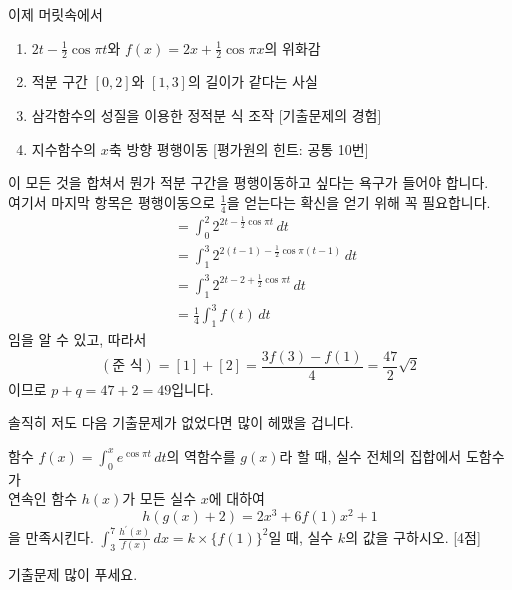 \documentclass[serif]{beamer}
\begin{document}
\begin{frame}
    이제 머릿속에서
    \begin{enumerate}[-]
        \item $2t-\frac{1}{2}\cos\pi t$와 $f(x)=2x+\frac{1}{2}\cos\pi x$의 위화감
        \item 적분 구간 $[0,2]$와 $[1,3]$의 길이가 같다는 사실
        \item 삼각함수의 성질을 이용한 정적분 식 조작 [기출문제의 경험]
        \item 지수함수의 $x$축 방향 평행이동 [평가원의 힌트: 공통 10번]
    \end{enumerate}
    이 모든 것을 합쳐서 뭔가 적분 구간을 평행이동하고 싶다는 욕구가 들어야 합니다. \\
    여기서 마지막 항목은 평행이동으로 $\frac{1}{4}$을 얻는다는 확신을 얻기 위해 꼭 필요합니다.
    \begin{align*}
        [\text{2}]&=\int_{0}^{2}2^{2t-\frac{1}{2}\cos\pi t}\,dt\\[3pt]
        &=\int_{1}^{3}2^{2(t-1)-\frac{1}{2}\cos\pi(t-1)}\,dt\\[3pt]
        &=\int_{1}^{3}2^{2t-2+\frac{1}{2}\cos\pi t}\,dt\\[3pt]
        &=\frac{1}{4}\int_{1}^{3}f(t)\,dt
    \end{align*}
    임을 알 수 있고, 따라서
    \[
        (\text{준 식})=[\text{1}]+[\text{2}]=\frac{3f(3)-f(1)}{4}=\frac{47}{2}\sqrt{2}
    \]
    이므로 $p+q=47+2=49$입니다.
\end{frame}

\begin{frame}
    솔직히 저도 다음 기출문제가 없었다면 많이 헤맸을 겁니다.
    \begin{hint}
        함수 $\displaystyle f(x)=\int_0^xe^{\cos\pi t}\,dt$의 역함수를 $g(x)$라 할 때, 실수 전체의 집합에서 도함수가\\
        연속인 함수 $h(x)$가 모든 실수 $x$에 대하여
        \[
            h(g(x)+2)=2x^3+6f(1)x^2+1
        \]
        을 만족시킨다. $\displaystyle\int_3^7\frac{h^\prime(x)}{f(x)}\,dx=k\times\{f(1)\}^2$일 때, 실수 $k$의 값을 구하시오. [4점]
    \end{hint}
    기출문제 많이 푸세요.
\end{frame}
\end{document}

